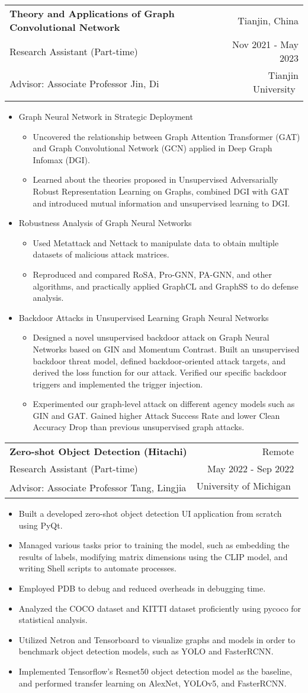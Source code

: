\documentclass[a4paper,20pt]{article}
\makeatletter
\newcommand{\resumeResearchSubheading}[7]{
  \vspace{5pt}\item
    \begin{tabular*} {0.98\textwidth} {@{\hspace{-0.5em}}l@{\extracolsep{\fill}}r@{}}
      \textbf{#1} & {#2}\null \\
      {#3} & {#4} \\
      {#5} & {#6} \vspace*{4pt}
      {#7}
    \end{tabular*}
  \vspace{-6pt}
}
\newcommand{\resumeResearchItemListStart}{
  \begin{itemize} [leftmargin=*]
}
\newcommand{\resumeResearchItemListEnd}{
  \end{itemize}
  \vspace{-5pt}
}
\newcommand{\resumeResearchItem}[1]{
  \item{
    {#1 \vspace{-1pt}}
  }
}
\newcommand{\resumeResearchMidItemListStart}{
  \begin{itemize} [leftmargin=*]
}
\newcommand{\resumeResearchMidItemListEnd}{
  \end{itemize}
  \vspace{-5pt}
}
\newcommand{\resumeResearchMidItem}[2]{
  \item{
    \textbf{#1}
    {#2 \vspace{-2pt}}
  }
}
\makeatother
\begin{document}
\resumeResearchSubheading
{Theory and Applications of Graph Convolutional Network} {Tianjin, China}
{Research Assistant (Part-time)} {Nov 2021 - May 2023}
{Advisor: Associate Professor Jin, Di} {Tianjin University}
\resumeResearchMidItemListStart
\resumeResearchMidItem{}
{Graph Neural Network in Strategic Deployment}
{
  \resumeResearchItemListStart
  \resumeResearchItem{}
  {Uncovered the relationship between Graph Attention Transformer (GAT) and Graph Convolutional Network (GCN) applied in Deep Graph Infomax (DGI).}
  \resumeResearchItem{}
  {Learned about the theories proposed in Unsupervised Adversarially Robust Representation Learning on Graphs, combined DGI with GAT and introduced mutual information and unsupervised learning to DGI.}
  \resumeResearchItemListEnd
}
\resumeResearchMidItem{}
{Robustness Analysis of Graph Neural Networks}
{
  \resumeResearchItemListStart
  \resumeResearchItem{}
  {Used Metattack and Nettack to manipulate data to obtain multiple datasets of malicious attack matrices.}
  \resumeResearchItem{}
  {Reproduced and compared RoSA, Pro-GNN, PA-GNN, and other algorithms, and practically applied GraphCL and GraphSS to do defense analysis.}
  \resumeResearchItemListEnd
}
\resumeResearchMidItem{}
{Backdoor Attacks in Unsupervised Learning Graph Neural Networks}
{
  \resumeResearchItemListStart
  \resumeResearchItem{}
  {Designed a novel unsupervised backdoor attack on Graph Neural Networks based on GIN and Momentum Contrast. Built an unsupervised backdoor threat model, defined backdoor-oriented attack targets, and derived the loss function for our attack. Verified our specific backdoor triggers and implemented the trigger injection.}
  \resumeResearchItem{}
  {Experimented our graph-level attack on different agency models such as GIN and GAT. Gained higher Attack Success Rate and lower Clean Accuracy Drop than previous unsupervised graph attacks.}
  \resumeResearchItemListEnd
}
\resumeResearchMidItemListEnd

\resumeResearchSubheading
{Zero-shot Object Detection (Hitachi)} {Remote}
{Research Assistant (Part-time)} {May 2022 - Sep 2022}
{Advisor: Associate Professor Tang, Lingjia} {University of Michigan}
\resumeResearchItemListStart
\resumeResearchItem{}
{Built a developed zero-shot object detection UI application from scratch using PyQt.}
\resumeResearchItem{}
{Managed various tasks prior to training the model, such as embedding the results of labels, modifying matrix dimensions using the CLIP model, and writing Shell scripts to automate processes.}
\resumeResearchItem{}
{Employed PDB to debug and reduced overheads in debugging time.}
\resumeResearchItem{}
{Analyzed the COCO dataset and KITTI dataset proficiently using pycoco for statistical analysis.}
\resumeResearchItem{}
{Utilized Netron and Tensorboard to visualize graphs and models in order to benchmark object detection models, such as YOLO and FasterRCNN.}
\resumeResearchItem{}
{Implemented Tensorflow's Resnet50 object detection model as the baseline, and performed transfer learning on AlexNet, YOLOv5, and FasterRCNN.}
\resumeResearchItemListEnd
\end{document}
